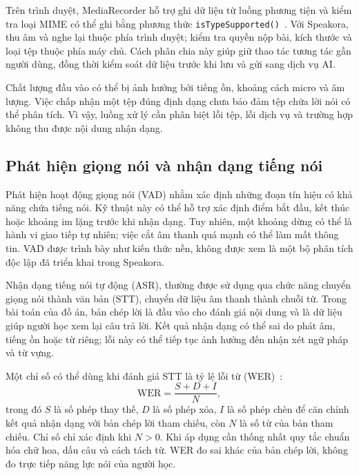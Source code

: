 \documentclass[12pt,a4paper,oneside]{report}
\begin{document}
Trên trình duyệt, MediaRecorder hỗ trợ ghi dữ liệu từ luồng phương tiện và kiểm tra loại MIME có thể ghi bằng phương thức \texttt{isTypeSupported()}~\cite{mediarecorder}. Với Speakora, thu âm và nghe lại thuộc phía trình duyệt; kiểm tra quyền nộp bài, kích thước và loại tệp thuộc phía máy chủ. Cách phân chia này giúp giữ thao tác tương tác gần người dùng, đồng thời kiểm soát dữ liệu trước khi lưu và gửi sang dịch vụ AI.

Chất lượng đầu vào có thể bị ảnh hưởng bởi tiếng ồn, khoảng cách micro và âm lượng. Việc chấp nhận một tệp đúng định dạng chưa bảo đảm tệp chứa lời nói có thể phân tích. Vì vậy, luồng xử lý cần phân biệt lỗi tệp, lỗi dịch vụ và trường hợp không thu được nội dung nhận dạng.

\subsection{Phát hiện giọng nói và nhận dạng tiếng nói}

Phát hiện hoạt động giọng nói (VAD) nhằm xác định những đoạn tín hiệu có khả năng chứa tiếng nói. Kỹ thuật này có thể hỗ trợ xác định điểm bắt đầu, kết thúc hoặc khoảng im lặng trước khi nhận dạng. Tuy nhiên, một khoảng dừng có thể là hành vi giao tiếp tự nhiên; việc cắt âm thanh quá mạnh có thể làm mất thông tin. VAD được trình bày như kiến thức nền, không được xem là một bộ phân tích độc lập đã triển khai trong Speakora.

Nhận dạng tiếng nói tự động (ASR), thường được sử dụng qua chức năng chuyển giọng nói thành văn bản (STT), chuyển dữ liệu âm thanh thành chuỗi từ. Trong bài toán của đồ án, bản chép lời là đầu vào cho đánh giá nội dung và là dữ liệu giúp người học xem lại câu trả lời. Kết quả nhận dạng có thể sai do phát âm, tiếng ồn hoặc từ riêng; lỗi này có thể tiếp tục ảnh hưởng đến nhận xét ngữ pháp và từ vựng.

Một chỉ số có thể dùng khi đánh giá STT là tỷ lệ lỗi từ (WER)~\cite{wer}:
\begin{equation}
    \mathrm{WER} = \frac{S + D + I}{N},
    \label{eq:wer}
\end{equation}
trong đó $S$ là số phép thay thế, $D$ là số phép xóa, $I$ là số phép chèn để căn chỉnh kết quả nhận dạng với bản chép lời tham chiếu, còn $N$ là số từ của bản tham chiếu. Chỉ số chỉ xác định khi $N>0$. Khi áp dụng cần thống nhất quy tắc chuẩn hóa chữ hoa, dấu câu và cách tách từ. WER đo sai khác của bản chép lời, không đo trực tiếp năng lực nói của người học.

\end{document}
